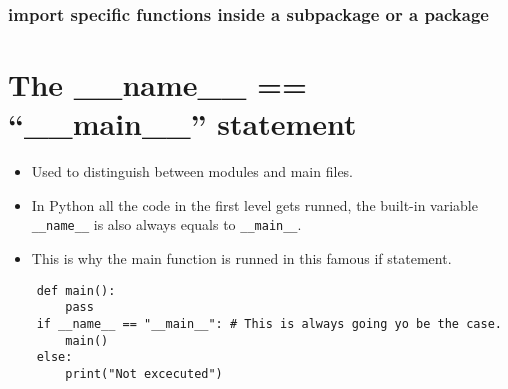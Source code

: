 \subsubsection{import specific functions inside a subpackage or a package}


\section{The \_\_name\_\_ == ``\_\_main\_\_'' statement}
\begin{itemize}
    \item Used to distinguish between modules and main files.
    \item In Python all the code in the first level gets runned, the built-in variable \verb|__name__| is also always equals to \verb|__main__|.
    \item This is why the main function is runned in this famous if statement. 
\end{itemize}
\begin{verbatim}
    def main():
        pass 
    if __name__ == "__main__": # This is always going yo be the case.
        main()
    else: 
        print("Not excecuted")
\end{verbatim}
